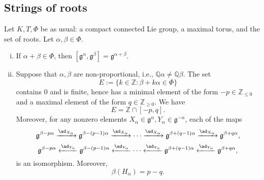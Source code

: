 \documentclass[reqno]{amsart} 
\begin{document}
\subsection{Strings of roots}\label{sec:cnh2vo0ard}
Let $K,T,\Phi$ be as usual: a compact connected Lie group, a maximal torus, and the set of roots.  Let $\alpha, \beta \in \Phi$.
\begin{lemma}\label{lem:strings-roots}
  \begin{enumerate}
[(i)]
  \item If $\alpha+\beta \in \Phi$, then $[\mathfrak{g}^\alpha, \mathfrak{g}^{\beta}] = \mathfrak{g}^{\alpha+\beta}$.
  \item Suppose that $\alpha,\beta$ are non-proportional, i.e., $\mathbb{Q} \alpha \neq \mathbb{Q} \beta$.  The set
    \begin{equation*}
      E := \{k \in \mathbb{Z} : \beta + k \alpha \in \Phi \}
    \end{equation*}
    contains $0$ and is finite, hence has a minimal element of the form $-p\in \mathbb{Z}_{ \leq 0}$ and a maximal element of the form $q \in \mathbb{Z}_{\geq 0}$.  We have
    \begin{equation}\label{eq:E-equals-Z-cap-interval}
      E = \mathbb{Z} \cap [-p,q].
    \end{equation}
    Moreover, for any nonzero elements $X_\alpha \in \mathfrak{g}^{\alpha}, Y_\alpha \in \mathfrak{g}^{-\alpha}$, each of the maps
    \begin{equation*}
      \mathfrak{g}^{\beta - p \alpha} \xrightarrow{\ad_{X_\alpha}} \mathfrak{g}^{\beta - (p-1) \alpha} \xrightarrow{\ad_{X_\alpha}} \dotsb \xrightarrow{\ad_{X_\alpha}} \mathfrak{g}^{\beta + (q-1) \alpha} \xrightarrow{\ad_{X_\alpha}} \mathfrak{g}^{\beta + q \alpha},
    \end{equation*}
    \begin{equation*}
      \mathfrak{g}^{\beta - p \alpha} \xleftarrow{\ad_{Y_\alpha}} \mathfrak{g}^{\beta - (p-1) \alpha} \xleftarrow{\ad_{Y_\alpha}} \dotsb \xleftarrow{\ad_{Y_\alpha}} \mathfrak{g}^{\beta + (q-1) \alpha} \xleftarrow{\ad_{Y_\alpha}} \mathfrak{g}^{\beta + q \alpha},
    \end{equation*}
    is an isomorphism.  Moreover,
    \begin{equation}\label{eq:beta-H-alpha-diff-p-q}
      \beta(H_\alpha) = p - q.
    \end{equation}
  \end{enumerate}
\end{lemma}
\end{document}
